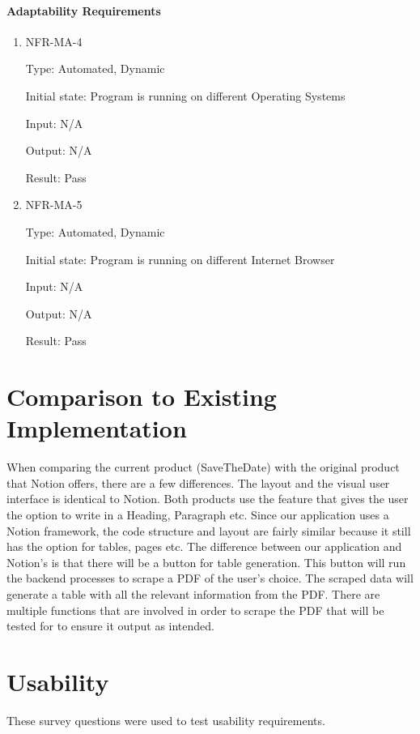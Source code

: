 \documentclass[12pt, titlepage]{article}
\begin{document}
\paragraph{Adaptability Requirements}

\begin{enumerate}

\item{NFR-MA-4\\}

Type: Automated, Dynamic 

Initial state: Program is running on different Operating Systems 

Input: N/A 

Output: N/A 

Result: Pass

\item{NFR-MA-5\\}

Type: Automated, Dynamic 

Initial state: Program is running on different Internet Browser 

Input: N/A 

Output: N/A 

Result: Pass

\end{enumerate}

\section{Comparison to Existing Implementation}	

When comparing the current product (SaveTheDate) with the original product that Notion offers, there are a few differences. The layout and the visual user interface is identical to Notion. Both products use the feature that gives the user the option to write in a Heading, Paragraph etc. Since our application uses a Notion framework, the code structure and layout are fairly similar because it still has the option for tables, pages etc. The difference between our application and Notion’s is that there will be a button for table generation. This button will run the backend processes to scrape a PDF of the user’s choice. The scraped data will generate a table with all the relevant information from the PDF. There are multiple functions that are involved in order to scrape the PDF that will be tested for to ensure it output as intended. 

\section{Usability}
These survey questions were used to test usability requirements.
\end{document}

